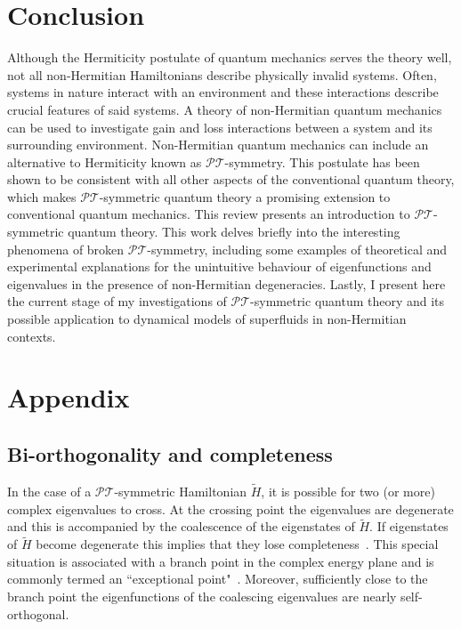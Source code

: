 \documentclass[12pt, a4paper]{report}
\newcommand\PT{\(\mathcal{PT}\)}
\begin{document}
\chapter{Conclusion}\label{Conclusion}
Although the Hermiticity postulate of quantum mechanics serves the theory well, not all non-Hermitian Hamiltonians describe physically invalid systems. Often, systems in nature interact with an environment and these interactions describe crucial features of said systems. A theory of non-Hermitian quantum mechanics can be used to investigate gain and loss interactions between a system and its surrounding environment. Non-Hermitian quantum mechanics can include an alternative to Hermiticity known as \PT-symmetry. This postulate has been shown to be consistent with all other aspects of the conventional quantum theory, which makes \PT-symmetric quantum theory a promising extension to conventional quantum mechanics. This review presents an introduction to \PT-symmetric quantum theory. This work delves briefly into the interesting phenomena of broken \PT-symmetry, including some examples of theoretical and experimental explanations for the unintuitive behaviour of eigenfunctions and eigenvalues in the presence of non-Hermitian degeneracies. Lastly, I present here the current stage of my investigations of \PT-symmetric quantum theory and its possible application to dynamical models of superfluids in non-Hermitian contexts.


\chapter{Appendix}\label{appendix}
\section{Bi-orthogonality and completeness}\label{Biorthogonal}
In the case of a \PT-symmetric Hamiltonian $\tilde{H}$, it is possible for two (or more) complex eigenvalues to cross. At the crossing point the eigenvalues are degenerate and this is accompanied by the coalescence of the eigenstates of $\tilde{H}$. If eigenstates of $\tilde{H}$ become degenerate this implies that they lose completeness~\cite{Brody_2013}. This special situation is associated with a branch point in the complex energy plane and is commonly termed an ``exceptional point"~\cite{Moiseyev}. Moreover, sufficiently close to the branch point the eigenfunctions of the coalescing eigenvalues are nearly self-orthogonal.
\end{document}
